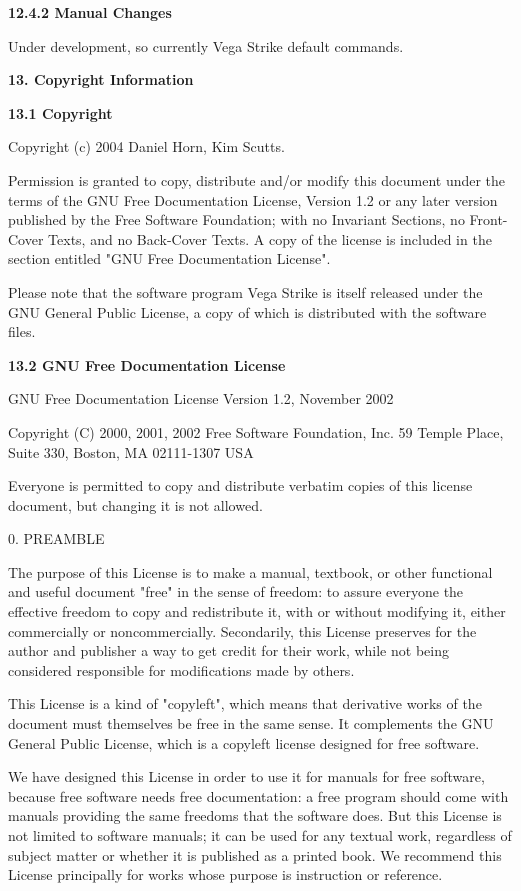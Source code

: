 \documentclass{article}
\begin{document}
\textbf{12.4.2 Manual Changes }

Under development, so currently Vega Strike default commands. 



\textbf{13. Copyright Information }

\textbf{13.1 Copyright }

Copyright (c) 2004 Daniel Horn, Kim Scutts. 

Permission is granted to copy, distribute and/or modify this document under the terms of the GNU Free Documentation License, Version 1.2 or any later version published by the Free Software Foundation; with no Invariant Sections, no Front-Cover Texts, and no Back-Cover Texts. A copy of the license is included in the section entitled "GNU Free Documentation License". 

Please note that the software program Vega Strike is itself released under the GNU General Public License, a copy of which is distributed with the software files. 

\textbf{13.2 GNU Free Documentation License }

GNU Free Documentation License Version 1.2, November 2002 

Copyright (C) 2000, 2001, 2002 Free Software Foundation, Inc. 59 Temple Place, Suite 330, Boston, MA  02111-1307 USA 

 Everyone is permitted to copy and distribute verbatim copies of this license document, but changing it is not allowed. 

0. PREAMBLE 

The purpose of this License is to make a manual, textbook, or other functional and useful document "free" in the sense of freedom: to assure everyone the effective freedom to copy and redistribute it, with or without modifying it, either commercially or noncommercially. Secondarily, this License preserves for the author and publisher a way to get credit for their work, while not being considered responsible for modifications made by others. 

This License is a kind of "copyleft", which means that derivative works of the document must themselves be free in the same sense. It complements the GNU General Public License, which is a copyleft license designed for free software. 

We have designed this License in order to use it for manuals for free software, because free software needs free documentation: a free program should come with manuals providing the same freedoms that the software does.  But this License is not limited to software manuals; it can be used for any textual work, regardless of subject matter or whether it is published as a printed book.  We recommend this License principally for works whose purpose is instruction or reference. 
\end{document}
